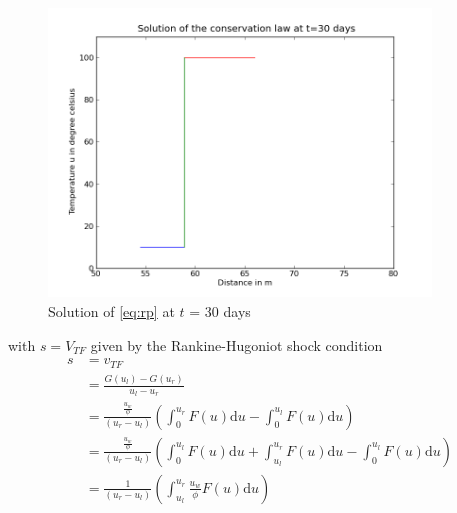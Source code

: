   \begin{figure}[htbp] %
     \centering
     \includegraphics[width=4in]{u0.png} 
     \caption{Solution of \ref{eq:rp} at $t$ = 30 days}
     \label{fig:u0}
  \end{figure}
  with 
  $s=V_{TF}$ given by the Rankine-Hugoniot shock condition
  \begin{align}\label{eq:si}
s &=v_{TF} \nonumber \\
   &=\frac{  G(u_{l})-G(u_{r})   }{ u_{l}-u_{r} } \nonumber \\
  &=\frac{\frac{u_{w}}{\phi}}{(u_{r}-u_{l})}\left( \int_{0}^{u_{r}} F(u)\mathrm{d}u  - \int_{0}^{u_{l}} F(u)\mathrm{d}u \right)\nonumber \\
  &=\frac{\frac{u_{w}}{\phi}}{(u_{r}-u_{l})}\left( \int_{0}^{u_{l}} F(u)\mathrm{d}u +\int_{u_{l}}^{u_{r}} F(u)\mathrm{d}u   - \int_{0}^{u_{l}} F(u)\mathrm{d}u \right)\nonumber \\
  &=\frac{1}{(u_{r}-u_{l})}\left( \int_{u_{l}}^{u_{r}} \frac{u_{w}}{\phi}F(u)\mathrm{d}u   \right) 
\end{align}

